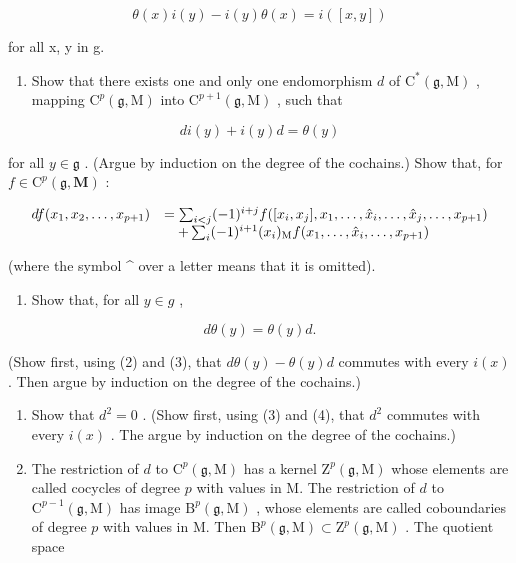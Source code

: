 \[
\theta (x) i (y) - i (y) \theta (x) = i ([ x, y ])
\]

for all x, y in g.

\begin{enumerate}
\def\labelenumi{(\alph{enumi})}
\setcounter{enumi}{1}
\tightlist
\item
  Show that there exists one and only one endomorphism \(d\) of \(\mathrm{C}^*(\mathfrak{g},\mathrm{M})\) , mapping \(\mathrm{C}^p (\mathfrak{g},\mathrm{M})\) into \(\mathrm{C}^{p + 1}(\mathfrak{g},\mathrm{M})\) , such that
\end{enumerate}

\[
d i (y) + i (y) d = \theta (y)\tag{3}
\]

for all \(y \in \mathfrak{g}\) . (Argue by induction on the degree of the cochains.) Show that, for \(f \in \mathrm{C}^p(\mathfrak{g}, \mathbf{M})\) :

\[
\begin{array}{r l} d f (x _ {1}, x _ {2}, \dots , x _ {p + 1}) & = \sum_ {i <   j} (- 1) ^ {i + j} f ([ x _ {i}, x _ {j} ], x _ {1}, \dots , \hat {x} _ {i}, \dots , \hat {x} _ {j}, \dots , x _ {p + 1}) \\ & \quad + \sum_ {i} (- 1) ^ {i + 1} (x _ {i}) _ {\mathrm{M}} f (x _ {1}, \dots , \hat {x} _ {i}, \dots , x _ {p + 1}) \end{array}
\]

(where the symbol \^{} over a letter means that it is omitted).

\begin{enumerate}
\def\labelenumi{(\alph{enumi})}
\setcounter{enumi}{2}
\tightlist
\item
  Show that, for all \(y \in g\) ,
\end{enumerate}

\[
d \theta (y) = \theta (y) d.\tag{4}
\]

(Show first, using (2) and (3), that \(d\theta(y) - \theta(y)d\) commutes with every \(i(x)\) . Then argue by induction on the degree of the cochains.)

\begin{enumerate}
\def\labelenumi{(\alph{enumi})}
\setcounter{enumi}{3}
\item
  Show that \(d^2 = 0\) . (Show first, using (3) and (4), that \(d^2\) commutes with every \(i(x)\) . The argue by induction on the degree of the cochains.)
\item
  The restriction of \(d\) to \(\mathrm{C}^p (\mathfrak{g},\mathrm{M})\) has a kernel \(\mathrm{Z}^p (\mathfrak{g},\mathrm{M})\) whose elements are called cocycles of degree \(p\) with values in M. The restriction of \(d\) to \(\mathrm{C}^{p - 1}(\mathfrak{g},\mathrm{M})\) has image \(\mathrm{B}^p (\mathfrak{g},\mathrm{M})\) , whose elements are called coboundaries of degree \(p\) with values in M. Then \(\mathrm{B}^p (\mathfrak{g},\mathrm{M})\subset \mathrm{Z}^p (\mathfrak{g},\mathrm{M})\) . The quotient space
\end{enumerate}

